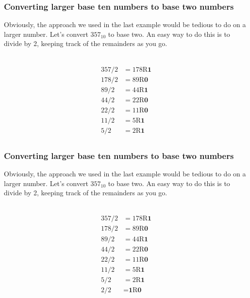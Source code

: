 \documentclass{if-beamer}
\begin{document}
\begin{frame}
\frametitle{Converting larger base ten numbers to base two numbers}

Obviously, the approach we used in the last example would be tedious to do on a larger number. Let's convert $357_{10}$ to base two. An easy way to do this is to divide by 2, keeping track of the remainders as you go. \\~\

\centering
\begin{align*}
357/2 &= 178 \textrm{R}\textbf{1} \\
178/2 &= 89 \textrm{R}\textbf{0}\\
89/2 &= 44 \textrm{R}\textbf{1}\\
44/2 &= 22 \textrm{R}\textbf{0}\\
22/2 &= 11 \textrm{R}\textbf{0}\\
11/2 &= 5 \textrm{R}\textbf{1}\\
5/2 &= 2 \textrm{R}\textbf{1}\\
\end{align*}
\end{frame}

\begin{frame}
\frametitle{Converting larger base ten numbers to base two numbers}

Obviously, the approach we used in the last example would be tedious to do on a larger number. Let's convert $357_{10}$ to base two. An easy way to do this is to divide by 2, keeping track of the remainders as you go. \\~\

\centering
\begin{align*}
357/2 &= 178 \textrm{R}\textbf{1} \\
178/2 &= 89 \textrm{R}\textbf{0}\\
89/2 &= 44 \textrm{R}\textbf{1}\\
44/2 &= 22 \textrm{R}\textbf{0}\\
22/2 &= 11 \textrm{R}\textbf{0}\\
11/2 &= 5 \textrm{R}\textbf{1}\\
5/2 &= 2 \textrm{R}\textbf{1}\\
2/2 &= \textbf{1}\textrm{R}\textbf{0} \\
\end{align*}
\end{frame}
\end{document}
